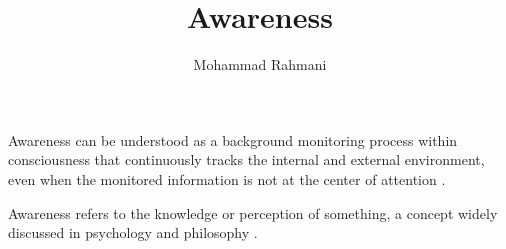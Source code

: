 \documentclass[a4paper]{article}
\title{Awareness}
\date{}
\author{Mohammad Rahmani}
\begin{document}
    \maketitle
    
    Awareness can be understood as a background monitoring process within consciousness that continuously tracks the internal and external environment, even when the monitored information is not at the center of attention \cite{brown-2003-the-benefits-of-being-present-mindfulness-and-its-role-in-psychological-well-being}.
    
    Awareness refers to the knowledge or perception of something, a concept widely discussed in psychology and philosophy .

    
    
\end{document}
